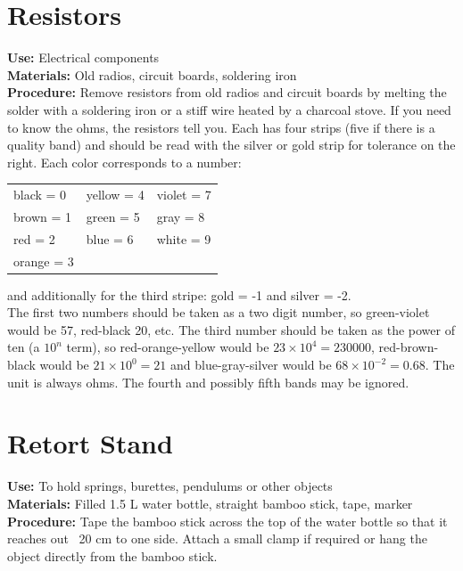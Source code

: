 \begin{multicols}{2}
\section{Resistors}
\label{sec:resistors}
\vspace{-10pt}
\textbf{Use:} Electrical components\\
\textbf{Materials:} Old radios, circuit boards, soldering iron\\
\textbf{Procedure:} Remove resistors from old radios and circuit boards by melting the solder with a soldering iron or a stiff wire heated by a charcoal stove. If you need to know the ohms, the resistors tell you. Each has four strips (five if there is a quality band) and should be read with the silver or gold strip for tolerance on the right. Each color corresponds to a number:\\[10pt]

\begin{tabular}{lll}
black = 0 & yellow = 4 & violet = 7\\
brown = 1 & green = 5 & gray = 8\\
red = 2 & blue = 6 & white = 9\\
orange = 3 & & \\[10pt]
\end{tabular} 

\noindent and additionally for the third stripe: gold = -1 and silver = -2. \\

\noindent The first two numbers should be taken as a two digit number, so green-violet would be 57, red-black 20, etc. The third number should be taken as the power of ten (a $ 10^{n} $ term), so red-orange-yellow would be $ 23 \times 10^{4} = 230000 $, red-brown-black would be $ 21 \times 10^{0} = 21 $ and blue-gray-silver would be $ 68 \times 10^{-2} = 0.68 $. The unit is always ohms. The fourth and possibly fifth bands may be ignored.

\columnbreak

\section{Retort Stand}
\label{sec:retort-stand}
\vspace{-10pt}
\textbf{Use:} To hold springs, burettes, pendulums or other objects\\
\textbf{Materials:} Filled 1.5 L water bottle, straight bamboo stick, tape, marker\\
\textbf{Procedure:} Tape the bamboo stick across the top of the water bottle so that it reaches out ~20 cm to one side. Attach a small clamp if required or hang the object directly from the bamboo stick.


\end{multicols}

